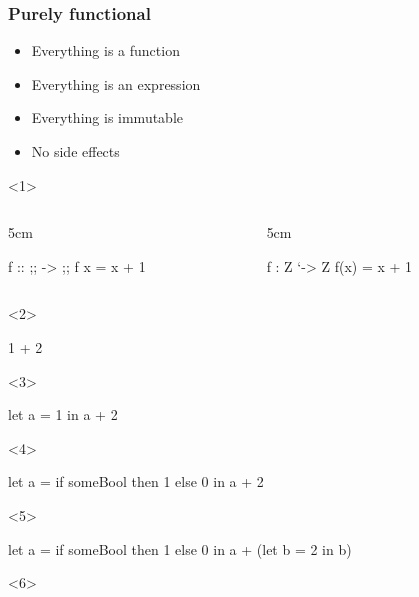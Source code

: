 \documentclass[17pt]{beamer}
\renewcommand{\(}[1]{\begin{columns}[#1]}
\renewcommand{\)}{\end{columns}}
\newcommand{\<}[1]{\begin{column}{#1}}
\renewcommand{\>}{\end{column}}
\begin{document}
\begin{frame}[fragile]
  \frametitle{Purely functional}
  \begin{minipage}[t][.3\textheight]{\textwidth}
  \begin{itemize}
  \item<1-> Everything is a function
  \item<2-> Everything is an expression
  \item<7-> Everything is immutable
  \item<8-> No side effects
  \end{itemize}
  \end{minipage}
  \begin{minipage}[c][.5\textheight]{\textwidth}
  \begin{center}
    \begin{onlyenv}<1>
      \({c}
      \<{5cm}
      \begin{code}[gobble=8]
        f :: ;; -> ;;
        f x = x + 1
      \end{code}
      \>
      \<{5cm}
      \begin{code}[gobble=8]
        f : Z `-> Z
        f(x) = x + 1
      \end{code}
      \>
      \)
    \end{onlyenv}
    \begin{onlyenv}<2>
      \begin{code}[gobble=8]
        1 + 2
      \end{code}
    \end{onlyenv}
    \begin{onlyenv}<3>
      \begin{code}[gobble=8]
        let a = 1
        in  a + 2
      \end{code}
    \end{onlyenv}
    \begin{onlyenv}<4>
      \begin{code}[gobble=8]
        let a = if someBool then 1 else 0
        in  a + 2
      \end{code}
    \end{onlyenv}
    \begin{onlyenv}<5>
      \begin{code}[gobble=8]
        let a = if someBool then 1 else 0
        in  a + (let b = 2 in b)
      \end{code}
    \end{onlyenv}
    \begin{onlyenv}<6>

\end{onlyenv}
\end{center}
\end{minipage}
\end{frame}
\end{document}
